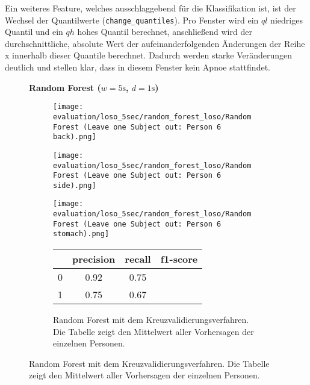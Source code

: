 Ein weiteres Feature, welches ausschlaggebend für die Klassifikation ist, ist der Wechsel der Quantilwerte (\texttt{change\_quantiles}).
Pro Fenster wird ein $ql$ niedriges Quantil und ein $qh$ hohes Quantil berechnet, anschließend wird der durchschnittliche, absolute Wert der aufeinanderfolgenden Änderungen der Reihe x innerhalb dieser Quantile berechnet.
Dadurch werden starke Veränderungen deutlich und stellen klar, dass in diesem Fenster kein Apnoe stattfindet. 


\begin{figure}[H]
  \textbf{Random Forest ($w=5\si{\s}$, $d=1\si{\s}$)}
    \centering
    \begin{subfigure}{1\textwidth}
        \texttt{[image: evaluation/loso\_5sec/random\_forest\_loso/Random Forest (Leave one Subject out: Person 6 back).png]}
      \end{subfigure}
      \begin{subfigure}{1\textwidth}
        \texttt{[image: evaluation/loso\_5sec/random\_forest\_loso/Random Forest (Leave one Subject out: Person 6 side).png]}
      \end{subfigure}
      \begin{subfigure}{1\textwidth}
        \texttt{[image: evaluation/loso\_5sec/random\_forest\_loso/Random Forest (Leave one Subject out: Person 6 stomach).png]}
    \end{subfigure}
    \begin{subfigure}{1\textwidth}
        \begin{center}
            \begin{tabular}{ | l | c | c | r | }
              \hline
               & precision & recall & f1-score\\ \hline
              0 & 0.92 & 0.75 & \\ \hline
              1 & 0.75 & 0.67 & \\
              \hline
            \end{tabular}
        \end{center}
        \caption{Random Forest mit dem Kreuzvalidierungsverfahren. Die Tabelle zeigt den Mittelwert aller Vorhersagen der einzelnen Personen.}
        \label{implementation:app:screenshots:user_studies_information}

\end{subfigure}
\end{figure}
